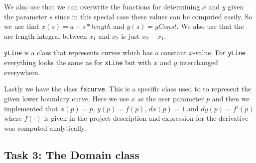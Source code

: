 \documentclass[a4paper,10pt]{article}
\begin{document}
We also use that we can overwrite the functions for determining $x$ and $y$ given the parameter $s$ since in this special case these values can be computed easily. So we use that $x(s) = a+s*length$ and $y(s) = yConst$. We also use that the arc length integral between $x_1$ and $x_2$ is just $x_2-x_1$.

\texttt{yLine} is a class that represents curves which has a constant $x$-value. For \texttt{yLine} everything looks the same as for \texttt{xLine} but with $x$ and $y$ interchanged everywhere.

Lastly we have the class \texttt{fxcurve}. This is a specific class used to to represent the given lower boundary curve. Here we use $x$ as the user parameter $p$ and then we implemented that $x(p) = p$, $y(p) = f(p)$, $dx(p) = 1$ and $dy(p) = f'(p)$ where $f(\cdot)$ is given in the project description and expression for the derivative was computed analytically.  
 

\subsection*{Task 3: The Domain class}
\end{document}
